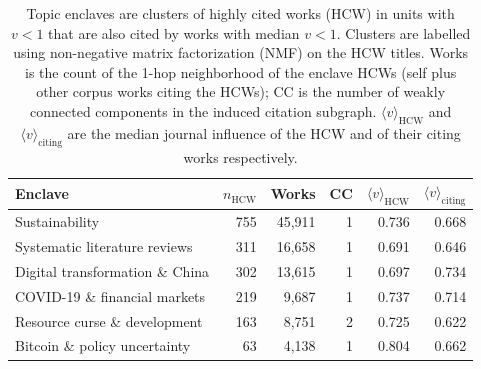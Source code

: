 \begin{table}[!htbp]
  \centering
  \caption{Topic enclaves are clusters of highly cited works (HCW) in units with $v<1$ that are also cited by works with median $v<1$.  Clusters are labelled using non-negative matrix factorization (NMF) on the HCW titles. Works is the count of the 1-hop neighborhood of the enclave HCWs (self plus other corpus works citing the HCWs); CC is the number of weakly connected components in the induced citation subgraph. $\langle v \rangle_{\text{HCW}}$ and $\langle v \rangle_{\text{citing}}$ are the median journal influence of the HCW and of their citing works respectively.}
  \label{tab:enclaves}
  \small
  \begin{tabular}{lrrrrr}
    \toprule
    Enclave & $n_{\text{HCW}}$ & Works & CC & $\langle v \rangle_{\text{HCW}}$ & $\langle v \rangle_{\text{citing}}$ \\
    \midrule
    Sustainability & 755 & 45,911 & 1 & 0.736 & 0.668 \\
    Systematic literature reviews & 311 & 16,658 & 1 & 0.691 & 0.646 \\
    Digital transformation \& China & 302 & 13,615 & 1 & 0.697 & 0.734 \\
    COVID-19 \& financial markets & 219 & 9,687 & 1 & 0.737 & 0.714 \\
    Resource curse \& development & 163 & 8,751 & 2 & 0.725 & 0.622 \\
    Bitcoin \& policy uncertainty & 63 & 4,138 & 1 & 0.804 & 0.662 \\
    \bottomrule
  \end{tabular}
\end{table}